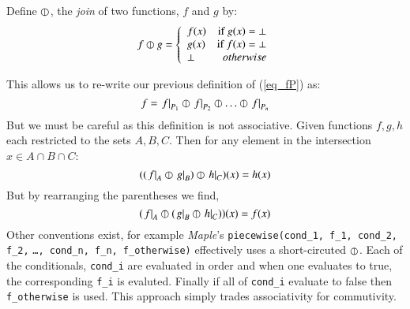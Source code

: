 \begin{definition}
	Define $\varobar$, the \emph{join} of two functions, $f$ and $g$ by:
	\begin{equation}
	\label{def:fjoin}
		f \varobar g =  
		\left\{
	     		\begin{array}{lr}
	       		f(x) & \text{if } g(x) = \bot \\
	       		g(x) & \text{if } f(x) = \bot \\
	       		\bot & otherwise
	     		\end{array}
	   	\right.
	\end{equation}
\end{definition}


This allows us to re-write our previous definition of (\ref{eq_fP}) as:
\begin{equation}
	\label{fjoin_partition}
	f = \left.f\right|_{P_1} \varobar \left.f\right|_{P_2} \varobar \ldots \varobar \left.f\right|_{P_n}
\end{equation}
But we must be careful as this definition is not associative.
Given functions $f,g,h$ each restricted to the sets $A,B,C$. 
Then for any element in the intersection $x \in A \cap B \cap C$:
\begin{equation}
	( (\left.f\right|_{A} \varobar \left.g\right|_{B} ) \varobar \left.h\right|_{C} )(x) = h(x)
\end{equation}
But by rearranging the parentheses we find,
\begin{equation}
	( \left.f\right|_{A} \varobar ( \left.g\right|_{B} \varobar \left.h\right|_{C} ))(x) = f(x)
\end{equation}
Other conventions exist, for example \emph{Maple}'s 
\texttt{piecewise(cond\_1, f\_1, cond\_2, f\_2,} \linebreak
\texttt{\ldots, cond\_n, f\_n, f\_otherwise)} 
effectively uses a short-circuted $\varobar$.
Each of the conditionals, \texttt{cond\_i} are evaluated in order and when one evaluates to true, the corresponding \texttt{f\_i} is evaluted.
Finally if all of \texttt{cond\_i} evaluate to false then \texttt{f\_otherwise} is used.
This approach simply trades associativity for commutivity.


